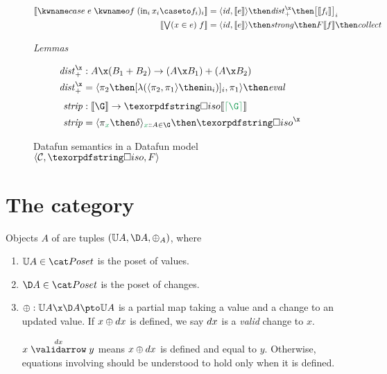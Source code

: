 \documentclass{rntz}\usepackage{fantasy}\geometry{textwidth=330pt,}
\begin{document}
\begin{figure*}
  \begin{align*}
    \den{\ecase{e} (\inj i{x_i} \caseto f_i)_i} &=
    \fork{\id, \den{e}} \then \morph{dist}^\x_+
    \then \bigkrof{\den{f_i}}_i
    \\
    \den{\ebigvee x e f} &= \fork{\id,\den{e}} \then \morph{strong}
    \then \downof{\den{f}} \then \morph{collect}
  \end{align*}

  \vspace{1ex}\emph{Lemmas}\vspace{-.5ex}

  \begin{align*}
    \morph{dist}^\x_+ &: A \x (B_1 + B_2) \to (A \x B_1) + (A \x B_2)\\
    \morph{dist}^\x_+ &= \fork{\pi_2 \then \krof{\lambda (\fork{\pi_2,\pi_1} \then \injc_i)}_i, \pi_1}
    \then \morph{eval}
    \\[1ex]
    \morph{strip} &: \den\G \to \discof{\den{\stripcxd\G}}\\
    \morph{strip} &= \fork{\pi_{\dvar x} \then \delta}_{\hd x A \in \G} \then \disco^\x
  \end{align*}

  \caption{Datafun semantics in a Datafun model $\tuple{\catC, \disco, \down}$}
  \label{fig:general-semantics}
\end{figure*}


\section{The category \CP}
\label{sec:changeposets}

Objects $A$ of \CP{} are tuples $(\vals A, \chgs A, \updfn_A)$, where
%
\begin{enumerate}
\item $\vals A \in \Poset$ is the poset of values.

\item $\chgs A \in \Poset$ is the poset of changes.

\item $\updfn : \vals A \x \chgs A \pto \vals A$ is a partial map taking a value
  and a change to an updated value. If $x \mathbin{\oplus} dx$ is defined, we say $dx$ is a
  \emph{valid} change to $x$.

  $\vld{\dx} x y$ means $x \mathbin{\oplus} dx$ is defined and equal to $y$. Otherwise,
  equations inv\-olv\-ing \updfn{} should be understood to hold only when it is
  defined.
\end{enumerate}
\end{document}
